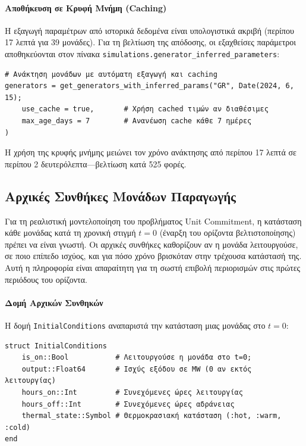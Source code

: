 \paragraph{Αποθήκευση σε Κρυφή Μνήμη (Caching)}
Η εξαγωγή παραμέτρων από ιστορικά δεδομένα είναι υπολογιστικά ακριβή (περίπου 17 λεπτά για 39 μονάδες). Για τη βελτίωση της απόδοσης, οι εξαχθείσες παράμετροι αποθηκεύονται στον πίνακα \texttt{simulations.generator\_inferred\_parameters}:

\begin{samepage}
\begin{verbatim}
# Ανάκτηση μονάδων με αυτόματη εξαγωγή και caching
generators = get_generators_with_inferred_params("GR", Date(2024, 6, 15);
    use_cache = true,       # Χρήση cached τιμών αν διαθέσιμες
    max_age_days = 7        # Ανανέωση cache κάθε 7 ημέρες
)
\end{verbatim}
\end{samepage}

Η χρήση της κρυφής μνήμης μειώνει τον χρόνο ανάκτησης από περίπου 17 λεπτά σε περίπου 2 δευτερόλεπτα---βελτίωση κατά 525 φορές.


\subsection{Αρχικές Συνθήκες Μονάδων Παραγωγής}
\label{subsec:initial-conditions}

Για τη ρεαλιστική μοντελοποίηση του προβλήματος Unit Commitment, η κατάσταση κάθε μονάδας κατά τη χρονική στιγμή $t=0$ (έναρξη του ορίζοντα βελτιστοποίησης) πρέπει να είναι γνωστή. Οι αρχικές συνθήκες καθορίζουν αν η μονάδα λειτουργούσε, σε ποιο επίπεδο ισχύος, και για πόσο χρόνο βρισκόταν στην τρέχουσα κατάστασή της. Αυτή η πληροφορία είναι απαραίτητη για τη σωστή επιβολή περιορισμών στις πρώτες περιόδους του ορίζοντα.

\paragraph{Δομή Αρχικών Συνθηκών}
Η δομή \texttt{InitialConditions} αναπαριστά την κατάσταση μιας μονάδας στο $t=0$:

\begin{samepage}
\begin{verbatim}
struct InitialConditions
    is_on::Bool           # Λειτουργούσε η μονάδα στο t=0;
    output::Float64       # Ισχύς εξόδου σε MW (0 αν εκτός λειτουργίας)
    hours_on::Int         # Συνεχόμενες ώρες λειτουργίας
    hours_off::Int        # Συνεχόμενες ώρες αδράνειας
    thermal_state::Symbol # Θερμοκρασιακή κατάσταση (:hot, :warm, :cold)
end
\end{verbatim}
\end{samepage}

